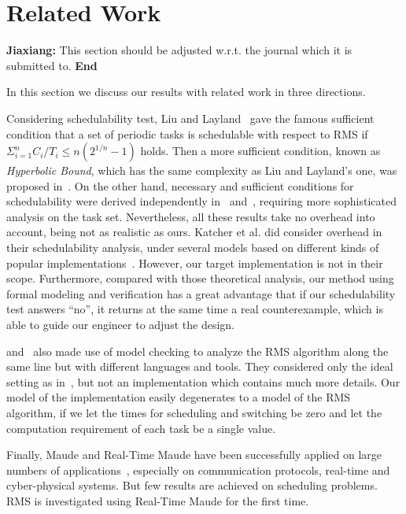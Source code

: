\documentclass{llncs}
\newcommand{\jx}[1]{{\bf Jiaxiang: }#1{ \bf End}}
\begin{document}
\section{Related Work}
\label{s:relate}
\jx{This section should be adjusted w.r.t. the journal which it is
  submitted to.}  

In this section we discuss our results with related
work in three directions.

Considering schedulability test, Liu and
Layland~\cite{DBLP:journals/jacm/LiuL73} gave the famous sufficient
condition that a set of periodic tasks is schedulable with respect to
RMS if $\displaystyle \Sigma^n_{i=1} C_i/T_i \le n(2^{1/n}-1)$
holds. Then a more sufficient condition, known as \emph{Hyperbolic
  Bound}, which has the same complexity as Liu and Layland's one, was
proposed in~\cite{DBLP:journals/tc/BiniBB03}. On the other hand,
necessary and sufficient conditions for schedulability were derived
independently in~\cite{DBLP:journals/rts/SpruntSL89}
and~\cite{audsley1993deadline}, requiring more sophisticated analysis
on the task set. Nevertheless, all these results take no overhead into
account, being not as realistic as ours. Katcher et al. did consider
overhead in their schedulability analysis, under several models based
on different kinds of popular
implementations~\cite{DBLP:journals/tse/KatcherAS93}.  However, our
target implementation is not in their scope.  Furthermore, compared
with those theoretical analysis, our method using formal modeling and
verification has a great advantage that if our schedulability test
answers ``no'', it returns at the same time a real counterexample,
which is able to guide our engineer to adjust the design.

\cite{DBLP:conf/iceccs/CuiDT14} and~\cite{TianD2011} also made use of
model checking to analyze the RMS algorithm along the same line but
with different languages and tools. They considered only the ideal
setting as in~\cite{DBLP:journals/jacm/LiuL73}, but not an
implementation which contains much more details. Our model of the
implementation easily degenerates to a model of the RMS algorithm, if
we let the times for scheduling and switching be zero and let the
computation requirement of each task be a single value.

Finally, Maude and Real-Time Maude have been successfully applied on
large numbers of applications~\cite{DBLP:journals/jlp/Meseguer12},
especially on communication protocols, real-time and cyber-physical
systems. But few results are achieved on scheduling problems. RMS is
investigated using Real-Time Maude for the first time.
\end{document}
